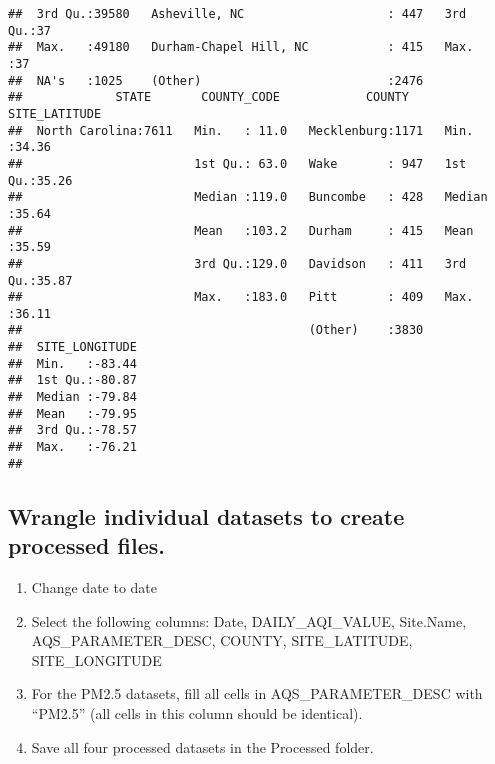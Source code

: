 \documentclass[]{article}
\newenvironment{Shaded}{\begin{snugshade}}{\end{snugshade}}
\newcommand{\KeywordTok}[1]{\textcolor[rgb]{0.13,0.29,0.53}{\textbf{#1}}}
\newcommand{\DataTypeTok}[1]{\textcolor[rgb]{0.13,0.29,0.53}{#1}}
\newcommand{\DecValTok}[1]{\textcolor[rgb]{0.00,0.00,0.81}{#1}}
\newcommand{\StringTok}[1]{\textcolor[rgb]{0.31,0.60,0.02}{#1}}
\newcommand{\CommentTok}[1]{\textcolor[rgb]{0.56,0.35,0.01}{\textit{#1}}}
\newcommand{\OperatorTok}[1]{\textcolor[rgb]{0.81,0.36,0.00}{\textbf{#1}}}
\newcommand{\NormalTok}[1]{#1}
\providecommand{\tightlist}{%
  \setlength{\itemsep}{0pt}\setlength{\parskip}{0pt}}
\begin{document}
\begin{verbatim}
##  3rd Qu.:39580   Asheville, NC                    : 447   3rd Qu.:37  
##  Max.   :49180   Durham-Chapel Hill, NC           : 415   Max.   :37  
##  NA's   :1025    (Other)                          :2476               
##             STATE       COUNTY_CODE            COUNTY     SITE_LATITUDE  
##  North Carolina:7611   Min.   : 11.0   Mecklenburg:1171   Min.   :34.36  
##                        1st Qu.: 63.0   Wake       : 947   1st Qu.:35.26  
##                        Median :119.0   Buncombe   : 428   Median :35.64  
##                        Mean   :103.2   Durham     : 415   Mean   :35.59  
##                        3rd Qu.:129.0   Davidson   : 411   3rd Qu.:35.87  
##                        Max.   :183.0   Pitt       : 409   Max.   :36.11  
##                                        (Other)    :3830                  
##  SITE_LONGITUDE  
##  Min.   :-83.44  
##  1st Qu.:-80.87  
##  Median :-79.84  
##  Mean   :-79.95  
##  3rd Qu.:-78.57  
##  Max.   :-76.21  
## 
\end{verbatim}

\subsection{Wrangle individual datasets to create processed
files.}\label{wrangle-individual-datasets-to-create-processed-files.}

\begin{enumerate}
\def\labelenumi{\arabic{enumi}.}
\setcounter{enumi}{2}
\tightlist
\item
  Change date to date
\item
  Select the following columns: Date, DAILY\_AQI\_VALUE, Site.Name,
  AQS\_PARAMETER\_DESC, COUNTY, SITE\_LATITUDE, SITE\_LONGITUDE
\item
  For the PM2.5 datasets, fill all cells in AQS\_PARAMETER\_DESC with
  ``PM2.5'' (all cells in this column should be identical).
\item
  Save all four processed datasets in the Processed folder.
\end{enumerate}

\begin{Shaded}
\end{Shaded}
\end{document}
